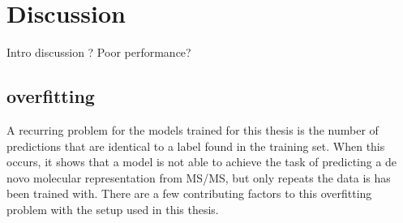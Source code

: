 \chapter{Discussion}
\label{chap:discussion}

Intro discussion ? Poor performance?

\section{overfitting}

A recurring problem for the models trained for this thesis is the number of predictions that are identical to a label found in the training set.
When this occurs, it shows that a model is not able to achieve the task of predicting a de novo molecular representation from \ac{MS/MS}, but only repeats the data is has been trained with.
There are a few contributing factors to this overfitting problem with the setup used in this thesis.

